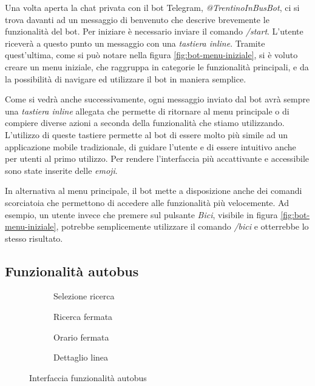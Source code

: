 Una volta aperta la chat privata con il bot Telegram, \textit{@TrentinoInBusBot}, ci si trova davanti ad un messaggio di benvenuto che descrive brevemente le funzionalità del bot. Per iniziare è necessario inviare il comando \textit{/start}. L'utente riceverà a questo punto un messaggio con una \textit{tastiera inline}. Tramite quest'ultima, come si può notare nella figura \ref{fig:bot-menu-iniziale}, si è voluto creare un menu iniziale, che raggruppa in categorie le funzionalità principali, e da la possibilità di navigare ed utilizzare il bot in maniera semplice.

Come si vedrà anche successivamente, ogni messaggio inviato dal bot avrà sempre una \textit{tastiera inline} allegata che permette di ritornare al menu principale o di compiere diverse azioni a seconda della funzionalità che stiamo utilizzando. L'utilizzo di queste tastiere permette al bot di essere molto più simile ad un applicazione mobile tradizionale, di guidare l'utente e di essere intuitivo anche per utenti al primo utilizzo. Per rendere l'interfaccia più accattivante e accessibile sono state inserite delle \textit{emoji}.

In alternativa al menu principale, il bot mette a disposizione anche dei comandi scorciatoia che permettono di accedere alle funzionalità più velocemente. Ad esempio, un utente invece che premere sul pulsante \textit{Bici}, visibile in figura \ref{fig:bot-menu-iniziale}, potrebbe semplicemente utilizzare il comando \textit{/bici} e otterrebbe lo stesso risultato.

\subsection{Funzionalità autobus}

\begin{figure}[htb]
    \centering 
\begin{subfigure}{0.20\textwidth}
\caption{Selezione ricerca}
\label{fig:bot-selezione-autobus}
\end{subfigure}\hfil
\begin{subfigure}{0.20\textwidth}
\caption{Ricerca fermata}
\label{fig:bot-selezione-fermata}
\end{subfigure}\hfil 
\begin{subfigure}{0.20\textwidth}
\caption{Orario fermata}
\label{fig:bot-orario-fermata}
\end{subfigure}\hfil 
\begin{subfigure}{0.20\textwidth}
\caption{Dettaglio linea}
\label{fig:bot-orari-linea}
\end{subfigure}
\caption{
\label{fig:autobus_interfaccia} Interfaccia funzionalità autobus}
\end{figure}

